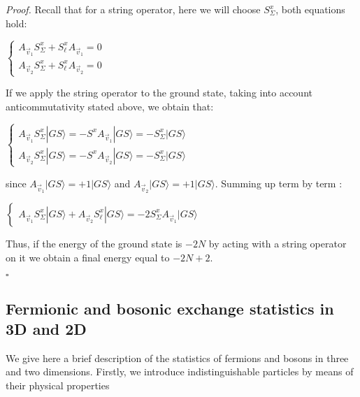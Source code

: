 \documentclass{Configuration_Files/PoliMi3i_thesis}
\begin{document}
\textit{Proof.} \newline
Recall that for a string operator, here we will choose $S^x_\Sigma$, both equations hold:

\begin{center}
	$\begin{cases} 
		A_{\vec{v}_1}S^x_\Sigma + S^x_\ell A_{\vec{v}_1}  =0 \\
		A_{\vec{v}_2} S^x_\Sigma + S^x_\ell A_{\vec{v}_2} =0
	\end{cases}$ 
\end{center}

If we apply the string operator to the ground state, taking into account anticommutativity stated above, we obtain that:

\begin{center}
	$\begin{cases}
		A_{\vec{v}_1} S^x_\Sigma |GS\rangle = - S^x A_{\vec{v}_1} |GS\rangle = - S^x_\Sigma |GS\rangle \\
		
		A_{\vec{v}_2} S^x_\Sigma |GS\rangle = - S^x A_{\vec{v}_2} |GS\rangle = - S^x_\Sigma |GS\rangle
	\end{cases}$ 
\end{center}

since $A_{\vec{v}_1}|GS\rangle = +1|GS\rangle$ and $A_{\vec{v}_2}|GS\rangle = +1|GS\rangle$.
Summing up term by term :

\begin{center}
	$\begin{cases}
		A_{\vec{v}_1} S^x_\Sigma |GS\rangle + A_{\vec{v}_2} S^x_\ell |GS\rangle = - 2 S^x_\Sigma A_{\vec{v}_1} |GS\rangle
	\end{cases}$ 
\end{center}

Thus, if the energy of the ground state is $-2N$ by acting with a string operator on  it we obtain a final energy equal to $-2N+2$.

\hfill $\square$ 







\subsection{Fermionic and bosonic exchange statistics in 3D and 2D}
We give here a brief description of the statistics of fermions and bosons in three and two dimensions. \newline
Firstly, we introduce indistinguishable particles by means of their physical properties 
\end{document}
